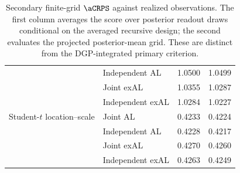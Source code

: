 \begin{table}[p]
{\begin{tabular}{@{}>{\raggedright\arraybackslash}p{}>{\raggedright\arraybackslash}p{}rr@{}}
 & Independent AL & 1.0500 & 1.0499 \\
 & Joint exAL & 1.0355 & 1.0287 \\
 & Independent exAL & 1.0284 & 1.0227 \\
\addlinespace[2pt]
Student-\(t\) location--scale & Joint AL & 0.4233 & 0.4224 \\
 & Independent AL & 0.4228 & 0.4217 \\
 & Joint exAL & 0.4270 & 0.4260 \\
 & Independent exAL & 0.4263 & 0.4249 \\
\bottomrule
\end{tabular}
}%
\caption{Secondary finite-grid \(\aCRPS\) against realized observations. The first column averages the score over posterior readout draws conditional on the averaged recursive design; the second evaluates the projected posterior-mean grid. These are distinct from the DGP-integrated primary criterion.}
\label{tab:joint-qdesn-pure-desn-v1-secondary}
\end{table}
